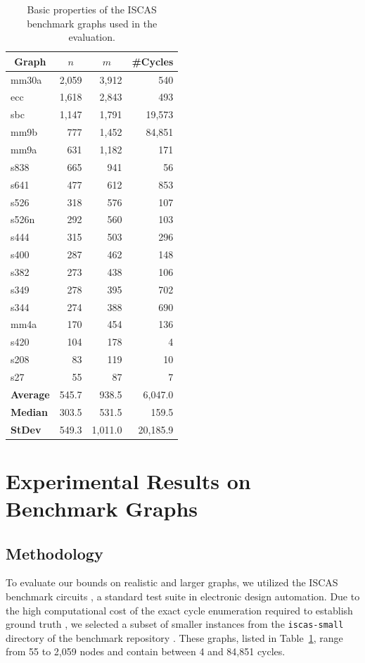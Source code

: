 \documentclass{article}
\theoremstyle{definition}
\begin{document}
\begin{table}[ht]
\centering
\caption{Basic properties of the ISCAS benchmark graphs used in the
  evaluation.}
\label{tab:iscas_properties}
\footnotesize
\begin{tabular}{lrrr}
\toprule
\multicolumn{1}{c}{Graph} & \multicolumn{1}{c}{$n$} & \multicolumn{1}{c}{$m$} & \multicolumn{1}{c}{\#Cycles} \\
\midrule
mm30a & 2,059 & 3,912 & 540 \\
ecc & 1,618 & 2,843 & 493 \\
sbc & 1,147 & 1,791 & 19,573 \\
mm9b & 777 & 1,452 & 84,851 \\
mm9a & 631 & 1,182 & 171 \\
s838 & 665 & 941 & 56 \\
s641 & 477 & 612 & 853 \\
s526 & 318 & 576 & 107 \\
s526n & 292 & 560 & 103 \\
s444 & 315 & 503 & 296 \\
s400 & 287 & 462 & 148 \\
s382 & 273 & 438 & 106 \\
s349 & 278 & 395 & 702 \\
s344 & 274 & 388 & 690 \\
mm4a & 170 & 454 & 136 \\
s420 & 104 & 178 & 4 \\
s208 & 83 & 119 & 10 \\
s27 & 55 & 87 & 7 \\
\midrule
\textbf{Average} & 545.7 & 938.5 & 6,047.0 \\
\textbf{Median} & 303.5 & 531.5 & 159.5 \\
\textbf{StDev} & 549.3 & 1,011.0 & 20,185.9 \\
\bottomrule
\end{tabular}
\end{table}

\section{Experimental Results on Benchmark Graphs}
\label{sec:benchmark-results}

\subsection{Methodology}

To evaluate our bounds on realistic and larger graphs, we utilized the
ISCAS benchmark circuits \citep{BrFu1985,BrBrKo1989,HaYaHa1999}, a
standard test suite in electronic design automation. Due to the high
computational cost of the exact cycle enumeration required to
establish ground truth \citep{HaJa08}, we selected a subset of smaller
instances from the \texttt{iscas-small} directory of the benchmark
repository \citep{Da14}. These graphs, listed in
Table~\ref{tab:iscas_properties}, range from 55 to 2,059 nodes and
contain between 4 and 84,851 cycles.
\end{document}
